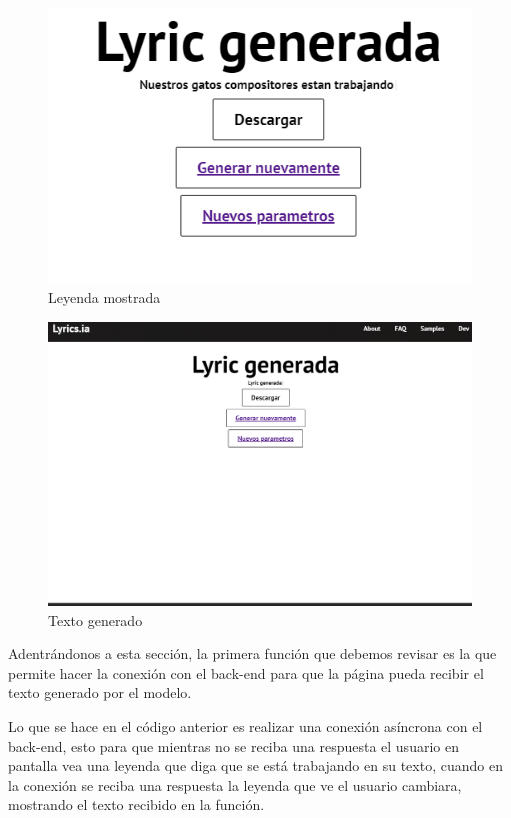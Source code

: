 \documentclass[12pt, a4paper, titlepage]{article}
\begin{document}
	\begin{figure}[H]
		\includegraphics[width=13.5cm]{./Imagenes/AplicacionWeb/Pleyenda.png}
		\centering 
		\caption{Leyenda mostrada}
	\end{figure}
	\begin{figure}[H]
	\includegraphics[width=13.5cm]{./Imagenes/AplicacionWeb/Ptexto.png}
	\centering 
	\caption{Texto generado}
	\end{figure}
	Adentrándonos a esta sección, la primera función que debemos revisar es la que permite hacer la conexión con el back-end para que la página pueda recibir el texto generado por el modelo.
	\begin{center}
		
	\end{center}
	Lo que se hace en el código anterior es realizar una conexión asíncrona con el back-end, esto para que mientras no se reciba una respuesta el usuario en pantalla vea una leyenda que diga que se está trabajando en su texto, cuando en la conexión se reciba una respuesta la leyenda que ve el usuario cambiara, mostrando el texto recibido en la función.
\end{document}
